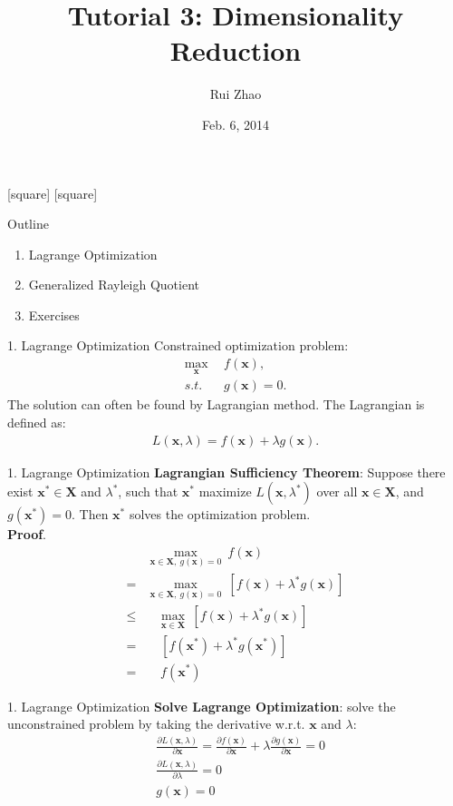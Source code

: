 \documentclass[compress,blue]{beamer}
\title[ENGG 5202 Pattern Recogntion Tutorial 3]{Tutorial 3: Dimensionality Reduction}
\author{Rui Zhao}
\institute{rzhao@ee.cuhk.edu.hk}
\date{Feb. 6, 2014}
\newcommand{\bx}{\mathbf{x}}
\newcommand{\bX}{\mathbf{X}}
\begin{document}
\begin{frame}
\titlepage
\end{frame}

[square]
[square]

\begin{frame}{Outline}
	\begin{enumerate}
		\item<1-2> Lagrange Optimization
		\vspace{0.1in}
		\item<1> Generalized Rayleigh Quotient 
		\vspace{0.1in}
		\item<1> Exercises 
	\end{enumerate}
\end{frame}

\begin{frame}{1. Lagrange Optimization}
	Constrained optimization problem:
	\begin{align}
		\max_{\bx} ~&~ f(\bx), \\
		s.t. ~&~ g(\bx) = 0.
	\end{align}
	The solution can often be found by Lagrangian method. The Lagrangian is defined as:
	\begin{align}
		L(\bx, \lambda) = f(\bx) + \lambda g(\bx).
	\end{align}
\end{frame}

\begin{frame}{1. Lagrange Optimization}
	\textbf{Lagrangian Sufficiency Theorem}: Suppose there exist $\bx^* \in \bX$ and $\lambda^*$, such that $\bx^*$ maximize $L(\bx, \lambda^*)$ over all $\bx \in \bX$, and $g(\bx^*) = 0$. Then $\bx^*$ solves the optimization problem. \\
	\vspace{0.1in}
	\textbf{Proof}. 
	\begin{align}
		& \max_{\bx\in\bX, ~g(\bx) = 0} ~f(\bx)\\
		=& \max_{\bx\in\bX, ~g(\bx) = 0} ~[f(\bx) + \lambda^* g(\bx)] \\
		\leq &~~~~ \max_{\bx\in\bX} ~[f(\bx) + \lambda^* g(\bx)] \\
		= & ~~~~ ~[f(\bx^*) + \lambda^* g(\bx^*)] \\
		= & ~~~~ ~ f(\bx^*)
	\end{align} 
\end{frame}

\begin{frame}{1. Lagrange Optimization}
	\textbf{Solve Lagrange Optimization}: solve the unconstrained problem by taking the derivative w.r.t. $\bx$ and $\lambda$:
	\begin{align}
		&\frac{\partial L(\bx, \lambda)}{\partial \bx} = \frac{\partial f(\bx)}{\partial \bx} + \lambda\frac{\partial g(\bx)}{\partial \bx} = 0 \\
		&\frac{\partial L(\bx, \lambda)}{\partial \lambda} = 0 \\
		&g(\bx) = 0
	\end{align}
\end{frame}
\end{document}
